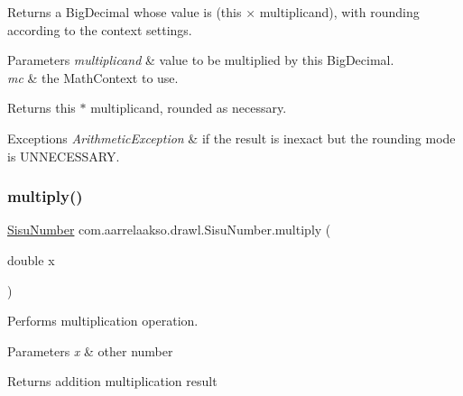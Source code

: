 Returns a Big\+Decimal whose value is (this × multiplicand), with rounding according to the context settings. 


\begin{DoxyParams}{Parameters}
{\em multiplicand} & value to be multiplied by this Big\+Decimal. \\
\hline
{\em mc} & the Math\+Context to use. \\
\hline
\end{DoxyParams}
\begin{DoxyReturn}{Returns}
this $\ast$ multiplicand, rounded as necessary. 
\end{DoxyReturn}

\begin{DoxyExceptions}{Exceptions}
{\em Arithmetic\+Exception} & if the result is inexact but the rounding mode is U\+N\+N\+E\+C\+E\+S\+S\+A\+RY. \\
\hline
\end{DoxyExceptions}
\mbox{\label{classcom_1_1aarrelaakso_1_1drawl_1_1_sisu_number_a3255e6ba51f01b287c0acf5121c31d48}} 
\subsubsection{\texorpdfstring{multiply()}{multiply()}\hspace{0.1cm}{\footnotesize\ttfamily [3/3]}}
{\footnotesize\ttfamily \hyperlink{classcom_1_1aarrelaakso_1_1drawl_1_1_sisu_number}{Sisu\+Number} com.\+aarrelaakso.\+drawl.\+Sisu\+Number.\+multiply (\begin{DoxyParamCaption}\item[{double}]{x }\end{DoxyParamCaption})\hspace{0.3cm}{\ttfamily [protected]}}



Performs multiplication operation. 


\begin{DoxyParams}{Parameters}
{\em x} & other number \\
\hline
\end{DoxyParams}
\begin{DoxyReturn}{Returns}
addition multiplication result 
\end{DoxyReturn}
\mbox{\label{classcom_1_1aarrelaakso_1_1drawl_1_1_sisu_number_a2386c00d733c84ee7c97ae11d7d05ea8}} 
